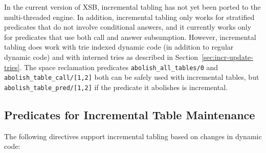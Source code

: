In the current version of XSB, incremental tabling has not yet been
ported to the multi-threaded engine.  In addition, incremental tabling
only works for stratified predicates that do not involve conditional
answers, and it currently works only for predicates that use both call
and answer subsumption.  However, incremental tabling does work with
trie indexed dynamic code (in addition to regular dynamic code) and
with interned tries as described in
Section~\ref{sec:incr-update-tries}.  The space reclamation predicates
{\tt abolish\_all\_tables/0} and {\tt abolish\_table\_call/[1,2]} both
can be safely used with incremental tables, but {\tt
  abolish\_table\_pred/[1,2]} if the predicate it abolishes is
incremental.

\subsection{Predicates for Incremental Table Maintenance} \label{sec:incr-preds1}

The following directives support incremental tabling based on changes
in dynamic code: 

